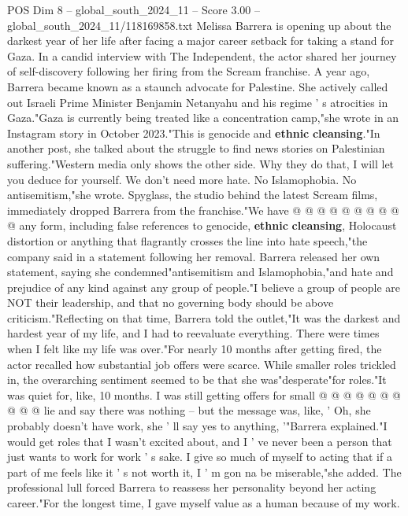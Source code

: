 \begin{textsample}{POS Dim 8 – global\_south\_2024\_11 – Score 3.00 – global\_south\_2024\_11/118169858.txt}  \label{ex:f8_pos_158}
Melissa Barrera is opening up about the darkest year of her life after facing a major career setback for taking a stand for Gaza.
In a candid interview with The Independent, the actor shared her journey of self-discovery following her firing from the Scream franchise.
A year ago, Barrera became known as a staunch advocate for Palestine.
She actively called out Israeli Prime Minister Benjamin Netanyahu and his regime ' s atrocities in Gaza."Gaza is currently being treated like a concentration camp,"she wrote in an Instagram story in October 2023."This is genocide and \textbf{ethnic} \textbf{cleansing}."In another post, she talked about the struggle to find news stories on Palestinian suffering."Western media only shows the other side.
Why they do that, I will let you deduce for yourself.
We don't need more hate.
No Islamophobia.
No antisemitism,"she wrote.
Spyglass, the studio behind the latest Scream films, immediately dropped Barrera from the franchise."We have @ @ @ @ @ @ @ @ @ @ any form, including false references to genocide, \textbf{ethnic} \textbf{cleansing}, Holocaust distortion or anything that flagrantly crosses the line into hate speech,"the company said in a statement following her removal.
Barrera released her own statement, saying she condemned"antisemitism and Islamophobia,"and hate and prejudice of any kind against any group of people."I believe a group of people are NOT their leadership, and that no governing body should be above criticism."Reflecting on that time, Barrera told the outlet,"It was the darkest and hardest year of my life, and I had to reevaluate everything.
There were times when I felt like my life was over."For nearly 10 months after getting fired, the actor recalled how substantial job offers were scarce.
While smaller roles trickled in, the overarching sentiment seemed to be that she was"desperate"for roles."It was quiet for, like, 10 months.
I was still getting offers for small @ @ @ @ @ @ @ @ @ @ lie and say there was nothing -- but the message was, like, ' Oh, she probably doesn't have work, she ' ll say yes to anything, '"Barrera explained."I would get roles that I wasn't excited about, and I ' ve never been a person that just wants to work for work ' s sake.
I give so much of myself to acting that if a part of me feels like it ' s not worth it, I ' m gon na be miserable,"she added.
The professional lull forced Barrera to reassess her personality beyond her acting career."For the longest time, I gave myself value as a human because of my work.

\end{textsample}
